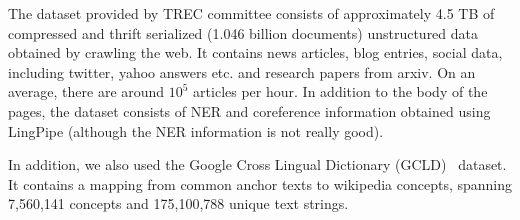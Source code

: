 The dataset provided by TREC committee consists of approximately 4.5 TB of compressed and thrift serialized (1.046 billion documents) unstructured data obtained by crawling the web. It contains news articles, blog entries, social data, including twitter, yahoo answers etc. and research papers from arxiv. On an average, there are around $10^{5}$ articles per hour. In addition to the body of the pages, the dataset consists of NER and coreference information obtained using LingPipe (although the NER information is not really good).

In addition, we also used the Google Cross Lingual Dictionary (GCLD)~\cite{gcld} dataset. It contains a mapping from common anchor texts to wikipedia concepts, spanning 7,560,141 concepts and 175,100,788 unique text strings.

